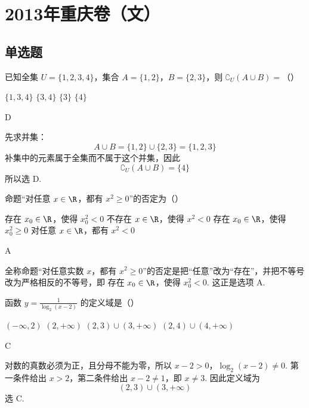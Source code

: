 \chapter{2013年重庆卷（文）}

\section{单选题}

\begin{problem}
已知全集 \(U = \{1, 2, 3, 4\}\)，集合 \(A = \{1, 2\}\)，\(B = \{2, 3\}\)，则 \(\complement_U (A \cup B) =\)（\quad）

\choices
    {\(\{1,3,4\}\)}
    {\(\{3,4\}\)}
    {\(\{3\}\)}
    {\(\{4\}\)}
\begin{answer}
D
\end{answer}
\begin{solution}
先求并集：
\[
A\cup B=\{1,2\}\cup\{2,3\}=\{1,2,3\}
\]
补集中的元素属于全集而不属于这个并集，因此
\[
\complement_U(A\cup B)=\{4\}
\]
所以选 D.
\end{solution}
\end{problem}

\begin{problem}
命题“对任意 \(x \in \R\)，都有 \(x^2 \geqslant 0\)”的否定为（\quad）

\choices
    {存在 \(x_0 \in \R\)，使得 \(x_0^2 < 0\)}
    {不存在 \(x \in \R\)，使得 \(x^2 < 0\)}
    {存在 \(x_0 \in \R\)，使得 \(x_0^2 \geqslant 0\)}
    {对任意 \(x \in \R\)，都有 \(x^2 < 0\)}
\begin{answer}
A
\end{answer}
\begin{solution}
全称命题“对任意实数 \(x\)，都有 \(x^2\geqslant0\)”的否定是把“任意”改为“存在”，并把不等号改为严格相反的不等号，即
存在 \(x_0\in\R\)，使得 \(x_0^2<0\).
这正是选项 A.
\end{solution}
\end{problem}

\begin{problem}
函数 \( y = \frac{1}{\log_2(x - 2)} \) 的定义域是（\quad）

\choices
    {\((-\infty, 2)\)}
    {\((2, +\infty)\)}
    {\((2,3)\cup (3, + \infty)\)}
    {\((2,4)\cup (4, + \infty)\)}
\begin{answer}
C
\end{answer}
\begin{solution}
对数的真数必须为正，且分母不能为零，所以
\(x-2>0\)，\(\log_2(x-2)\neq0\).
第一条件给出 \(x>2\)，第二条件给出 \(x-2\neq1\)，即 \(x\neq3\). 因此定义域为
\[
(2,3)\cup(3,+\infty)
\]
选 C.
\end{solution}
\end{problem}

